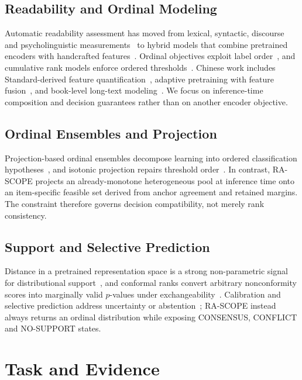 \documentclass[conference]{IEEEtran}
\begin{document}
\subsection{Readability and Ordinal Modeling}
Automatic readability assessment has moved from lexical, syntactic, discourse
and psycholinguistic measurements~\cite{xia2016text,deutsch2020linguistic} to
hybrid models that combine pretrained encoders with handcrafted
features~\cite{lee2021pushing,zeng2023promptara,zeng2024interpretara,zeng2025self}.
Ordinal objectives exploit label order~\cite{zeng2022enhancing,lim2024improving},
and cumulative rank models enforce ordered
thresholds~\cite{cao2020rank}. Chinese work includes Standard-derived feature
quantification~\cite{li2025quantification}, adaptive pretraining with feature
fusion~\cite{yang2025chinese}, and book-level long-text
modeling~\cite{li2024going}. We focus on inference-time composition and
decision guarantees rather than on another encoder objective.

\subsection{Ordinal Ensembles and Projection}
Projection-based ordinal ensembles decompose learning into ordered
classification hypotheses~\cite{perezortiz2014projection}, and isotonic
projection repairs threshold order~\cite{barlow1972statistical}. In contrast,
RA-SCOPE projects an already-monotone heterogeneous pool at inference time onto
an item-specific feasible set derived from anchor agreement and retained
margins. The constraint therefore governs decision compatibility, not merely
rank consistency.

\subsection{Support and Selective Prediction}
Distance in a pretrained representation space is a strong non-parametric signal
for distributional support~\cite{sun2022out}, and conformal ranks convert
arbitrary nonconformity scores into marginally valid $p$-values under
exchangeability~\cite{bates2023testing}. Calibration and selective prediction
address uncertainty or abstention~\cite{guo2017calibration,ovadia2019trust,
geifman2019selectivenet,xin2021art}; RA-SCOPE instead always returns an ordinal
distribution while exposing CONSENSUS, CONFLICT and NO-SUPPORT states.

\section{Task and Evidence}
\end{document}
